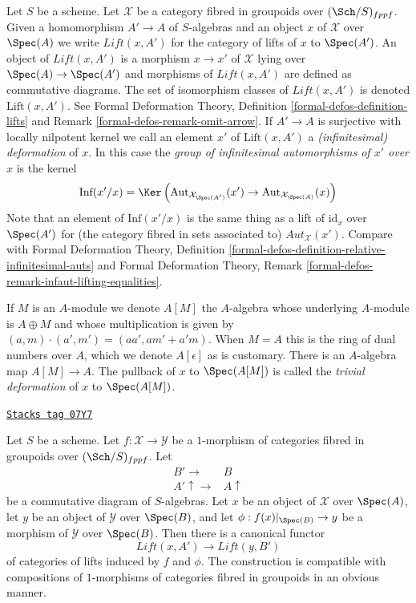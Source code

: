 \medskip\noindent
Let $S$ be a scheme. Let $\mathcal{X}$ be a category fibred in groupoids
over $(\Sch/S)_{fppf}$. Given a homomorphism $A' \to A$ of $S$-algebras
and an object $x$ of $\mathcal{X}$ over $\Spec(A)$ we write
$\textit{Lift}(x, A')$ for the category of lifts of $x$ to $\Spec(A')$.
An object of $\textit{Lift}(x, A')$ is a morphism $x \to x'$ of $\mathcal{X}$
lying over $\Spec(A) \to \Spec(A')$ and morphisms of $\textit{Lift}(x, A')$
are defined as commutative diagrams. The set of isomorphism classes of
$\textit{Lift}(x, A')$ is denoted $\text{Lift}(x, A')$. See
Formal Deformation Theory, Definition \ref{formal-defos-definition-lifts} and
Remark \ref{formal-defos-remark-omit-arrow}.
If $A' \to A$ is surjective with locally nilpotent kernel we call an element
$x'$ of $\text{Lift}(x, A')$ a {\it (infinitesimal) deformation} of $x$.
In this case the {\it group of infinitesimal automorphisms of $x'$ over $x$}
is the kernel
$$
\text{Inf}(x'/x) =
\Ker\left(
\text{Aut}_{\mathcal{X}_{\Spec(A')}}(x') \to
\text{Aut}_{\mathcal{X}_{\Spec(A)}}(x)\right)
$$
Note that an element of $\text{Inf}(x'/x)$ is the same thing as a lift
of $\text{id}_x$ over $\Spec(A')$ for (the category fibred in sets associated
to) $\mathit{Aut}_\mathcal{X}(x')$. Compare with
Formal Deformation Theory, Definition
\ref{formal-defos-definition-relative-infinitesimal-auts} and
Formal Deformation Theory, Remark
\ref{formal-defos-remark-infaut-lifting-equalities}.

\medskip\noindent
If $M$ is an $A$-module we denote $A[M]$ the $A$-algebra whose underlying
$A$-module is $A \oplus M$ and whose multiplication is given by
$(a, m) \cdot (a', m') = (aa', am' + a'm)$. When $M = A$ this is the ring
of dual numbers over $A$, which we denote $A[\epsilon]$ as is customary.
There is an $A$-algebra map $A[M] \to A$. The pullback of $x$ to $\Spec(A[M])$
is called the {\it trivial deformation} of $x$ to $\Spec(A[M])$.

\begin{lemma}[Functoriality]
\label{artin-lemma-functoriality}
\href{https://stacks.math.columbia.edu/tag/07Y7}{\texttt{Stacks tag 07Y7}}

Let $S$ be a scheme. Let $f : \mathcal{X} \to \mathcal{Y}$ be a $1$-morphism
of categories fibred in groupoids over $(\Sch/S)_{fppf}$. Let
$$
\begin{array}{cc}B' \longrightarrow & B \\ A' \uparrow\longrightarrow & A \uparrow\end{array}
$$
be a commutative diagram of $S$-algebras. Let $x$ be an object of $\mathcal{X}$
over $\Spec(A)$, let $y$ be an object of $\mathcal{Y}$ over $\Spec(B)$,
and let $\phi : f(x)|_{\Spec(B)} \to y$ be a morphism of $\mathcal{Y}$
over $\Spec(B)$. Then there is a canonical functor
$$
\textit{Lift}(x, A') \longrightarrow \textit{Lift}(y, B')
$$
of categories of lifts induced by $f$ and $\phi$. The construction is
compatible with compositions of $1$-morphisms of categories fibred in
groupoids in an obvious manner.
\end{lemma}


